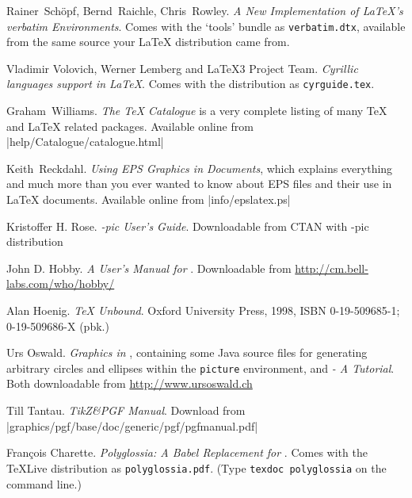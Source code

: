 \begin{thebibliography}{99}
 Rainer~Sch\"opf, Bernd~Raichle, Chris~Rowley.  
\newblock \emph{A New Implementation of \LaTeX's verbatim
  Environments}.
 \newblock Comes with the `tools' bundle as
  \texttt{verbatim.dtx}, available from the same source your \LaTeX{}
  distribution came from. 

 Vladimir Volovich, Werner Lemberg and \LaTeX3 Project Team.                    
    \newblock \emph{Cyrillic languages support in \LaTeX}.                                        
    \newblock Comes with the \LaTeXe{} distribution as                                            
  \texttt{cyrguide.tex}.                                                                          

 Graham~Williams.  \newblock \emph{The TeX
    Catalogue} is a very complete listing of many \TeX{} and \LaTeX{}
    related packages.
  \newblock Available online from \CTAN|help/Catalogue/catalogue.html|
  
 Keith~Reckdahl.  \newblock \emph{Using EPS Graphics in
    \LaTeXe{} Documents}, which explains everything and much more than
  you ever wanted to know about EPS files and their use in \LaTeX{}
  documents.  \newblock Available online from
  \CTAN|info/epslatex.ps|

 Kristoffer H. Rose.
  \newblock \emph{\Xy-pic User's Guide}.  \newblock
  Downloadable from CTAN with \Xy-pic distribution 
  
 John D. Hobby.
  \newblock \emph{A User's Manual for \MP}. \newblock
  Downloadable from \url{http://cm.bell-labs.com/who/hobby/} 
  
 Alan Hoenig.
  \newblock \emph{\TeX{} Unbound}. \newblock Oxford University Press, 1998,
    ISBN 0-19-509685-1; 0-19-509686-X (pbk.) 
  
 Urs Oswald.  
    \newblock \emph{Graphics in \LaTeXe{}}, containing some Java source files for 
    generating arbitrary circles and ellipses within the \texttt{picture} environment,
    and \emph{\MP{} - A Tutorial}.
  \newblock Both downloadable from \url{http://www.ursoswald.ch}

 Till Tantau.
  \newblock \emph{TikZ\&PGF Manual}.\newblock
  Download from \CTAN|graphics/pgf/base/doc/generic/pgf/pgfmanual.pdf|

 Fran\c{c}ois Charette.                    
    \newblock \emph{Polyglossia: A Babel Replacement for }.                                        
    \newblock Comes with the \TeX Live distribution as                                            
  \texttt{polyglossia.pdf}. (Type \texttt{texdoc polyglossia} on the command line.)


\end{thebibliography}
